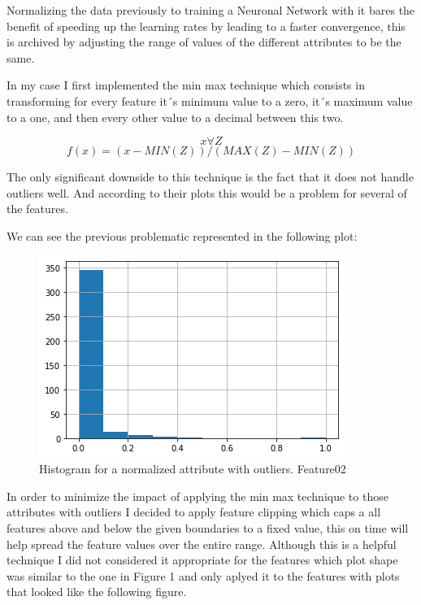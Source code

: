 \documentclass[12pt, a4paper]{article}
\begin{document}
	Normalizing the data previously to training a Neuronal Network with it bares the benefit of speeding up the learning rates by leading to a faster convergence, this is archived by adjusting the range of values of the different attributes to be the same.
	
	In my case I first implemented the min max technique which consists in transforming for every feature it´s minimum value to a zero, it´s maximum value to a one, and then every other value to a decimal between this two.
	
	\[ x \forall Z \]
	\[ f(x) = (x - MIN(Z))/(MAX(Z)-MIN(Z)) \]
	
	The only significant downside to this technique is the fact that it does not handle outliers well. And according to their plots this would be a problem for several of the features.
	
	We can see the previous problematic represented in the following plot:
	
	\begin{figure}[h]
		\label{Feature02N}
		\includegraphics{img/plots/feature02N.png}
		\caption{Histogram for a normalized attribute with outliers. Feature02}
	\end{figure}
	
	In order to minimize the impact of applying the min max technique to those attributes with outliers I decided to apply feature clipping which caps a all features above and below the given boundaries to a fixed value, this on time will help spread the feature values over the entire range. Although this is a helpful technique I did not considered it appropriate for the features which plot shape was similar to the one in Figure 1 and only aplyed it to the features with plots that looked like the following figure.
	
\end{document}
